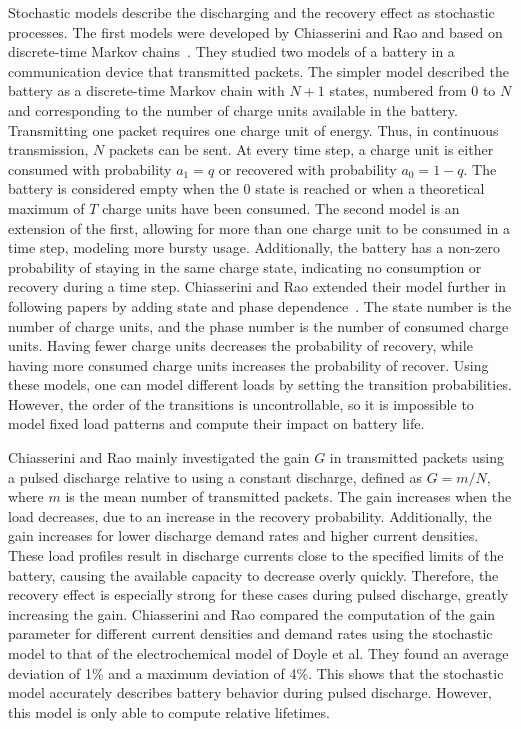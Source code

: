 \documentclass[../zhang_thesis.tex]{subfiles}
\begin{document}
Stochastic models describe the discharging and the recovery effect as stochastic processes. The first models were developed by Chiasserini and Rao and based on discrete-time Markov chains~\cite{chiasserini99b}. They studied two models of a battery in a communication device that transmitted packets. The simpler model described the battery as a discrete-time Markov chain with $N+1$ states, numbered from $0$ to $N$ and corresponding to the number of charge units available in the battery.
Transmitting one packet requires one charge unit of energy. Thus, in continuous transmission, $N$ packets can be sent. At every time step, a charge unit is either consumed with probability $a_1=q$ or recovered with probability $a_0=1-q$. The battery is considered empty when the $0$ state is reached or when a theoretical maximum of $T$ charge units have been consumed. The second model is an extension of the first, allowing for more than one charge unit to be consumed in a time step, modeling
more bursty usage. Additionally, the battery has a non-zero probability of staying in the same charge state, indicating no consumption or recovery during a time step. Chiasserini and Rao extended their model further in following papers by adding state and phase dependence~\cite{chiasserini99,chiasserini01,chiasserini01b}. The state number is the number of charge units, and the phase number is the number of consumed charge units. Having fewer charge units decreases the probability of
recovery, while having more consumed charge units increases the probability of recover. Using these models, one can model different loads by setting the transition probabilities. However, the order of the transitions is uncontrollable, so it is impossible to model fixed load patterns and compute their impact on battery life.

Chiasserini and Rao mainly investigated the gain $G$ in transmitted packets using a pulsed discharge relative to using a constant discharge, defined as $G=m/N$, where $m$ is the mean number of transmitted packets. The gain increases when the load decreases, due to an increase in the recovery probability. Additionally, the gain increases for lower discharge demand rates and higher current densities. These load profiles result in discharge currents close to the specified limits of the battery, causing the
available capacity to decrease overly quickly. Therefore, the recovery effect is especially strong for these cases during pulsed discharge, greatly increasing the gain. Chiasserini and Rao compared the computation of the gain parameter for different current densities and demand rates using the stochastic model to that of the electrochemical model of Doyle et al. They found an average deviation of 1\% and a maximum deviation of 4\%. This shows that the stochastic model accurately describes battery behavior during pulsed discharge. However, this model is only able to compute relative lifetimes.
\end{document}
